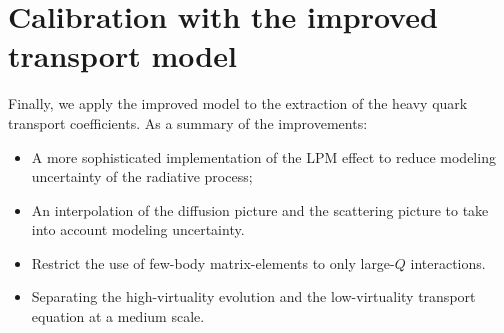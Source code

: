 \section{Calibration with the improved transport model}
Finally, we apply the improved model to the extraction of the heavy quark transport coefficients.
As a summary of the improvements:
\begin{itemize}
\item A more sophisticated implementation of the LPM effect to reduce modeling uncertainty of the radiative process;
\item An interpolation of the diffusion picture and the scattering picture to take into account modeling uncertainty.
\item Restrict the use of few-body matrix-elements to only large-$Q$ interactions.
\item Separating the high-virtuality evolution and the low-virtuality transport equation at a medium scale.
\end{itemize}


